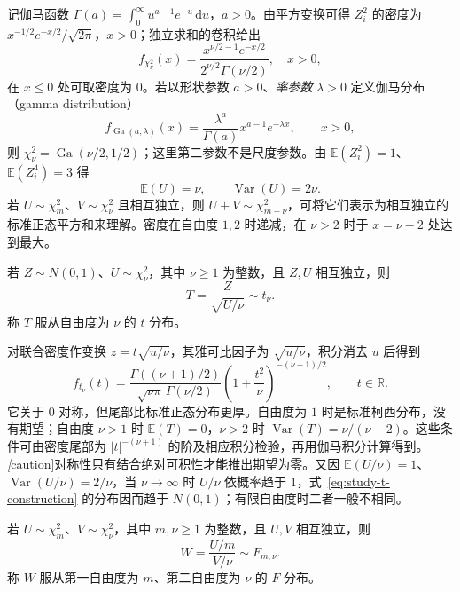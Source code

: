 记伽马函数 $\Gamma(a)=\int_0^\infty u^{a-1}e^{-u}\,\mathrm du$，$a>0$。由平方变换可得 $Z_i^2$ 的密度为 $x^{-1/2}e^{-x/2}/\sqrt{2\pi}$，$x>0$；独立求和的卷积给出
\begin{equation}
  f_{\chi^2_\nu}(x)
  =\frac{x^{\nu/2-1}e^{-x/2}}{2^{\nu/2}\Gamma(\nu/2)},
  \quad x>0,
  \label{eq:study-chi-square-density}
\end{equation}
在 $x\le0$ 处可取密度为 $0$。若以形状参数 $a>0$、\emph{率参数} $\lambda>0$ 定义伽马分布（gamma distribution）
\[
  f_{\operatorname{Ga}(a,\lambda)}(x)
  =\frac{\lambda^a}{\Gamma(a)}x^{a-1}e^{-\lambda x},\qquad x>0,
\]
则 $\chi^2_\nu=\operatorname{Ga}(\nu/2,1/2)$；这里第二参数不是尺度参数。由 $\mathbb E(Z_i^2)=1$、$\mathbb E(Z_i^4)=3$ 得
\[
  \mathbb E(U)=\nu,\qquad \operatorname{Var}(U)=2\nu.
\]
若 $U\sim\chi^2_m$、$V\sim\chi^2_\nu$ 且相互独立，则 $U+V\sim\chi^2_{m+\nu}$，可将它们表示为相互独立的标准正态平方和来理解。密度在自由度 $1,2$ 时递减，在 $\nu>2$ 时于 $x=\nu-2$ 处达到最大。

\begin{definition}[$t$ 分布]
\label{def:study-student-t}
若 $Z\sim N(0,1)$、$U\sim\chi^2_\nu$，其中 $\nu\ge1$ 为整数，且 $Z,U$ 相互独立，则
\begin{equation}
  T=\frac{Z}{\sqrt{U/\nu}}\sim t_\nu.
  \label{eq:study-t-construction}
\end{equation}
称 $T$ 服从自由度为 $\nu$ 的 $t$ 分布。
\end{definition}

对联合密度作变换 $z=t\sqrt{u/\nu}$，其雅可比因子为 $\sqrt{u/\nu}$，积分消去 $u$ 后得到
\begin{equation}
  f_{t_\nu}(t)
  =\frac{\Gamma((\nu+1)/2)}{\sqrt{\nu\pi}\,\Gamma(\nu/2)}
     \left(1+\frac{t^2}{\nu}\right)^{-(\nu+1)/2},
  \qquad t\in\mathbb R.
  \label{eq:study-t-density}
\end{equation}
它关于 $0$ 对称，但尾部比标准正态分布更厚。自由度为 $1$ 时是标准柯西分布，没有期望；自由度 $\nu>1$ 时 $\mathbb E(T)=0$，$\nu>2$ 时 $\operatorname{Var}(T)=\nu/(\nu-2)$。这些条件可由密度尾部为 $|t|^{-(\nu+1)}$ 的阶及相应积分检验，再用伽马积分计算得到。\emph[caution]{对称性只有结合绝对可积性才能推出期望为零。}又因 $\mathbb E(U/\nu)=1$、$\operatorname{Var}(U/\nu)=2/\nu$，当 $\nu\to\infty$ 时 $U/\nu$ 依概率趋于 $1$，式~\eqref{eq:study-t-construction} 的分布因而趋于 $N(0,1)$；有限自由度时二者一般不相同。

\begin{definition}[$F$ 分布]
\label{def:study-f-distribution}
若 $U\sim\chi^2_m$、$V\sim\chi^2_\nu$，其中 $m,\nu\ge1$ 为整数，且 $U,V$ 相互独立，则
\begin{equation}
  W=\frac{U/m}{V/\nu}\sim F_{m,\nu}.
  \label{eq:study-f-construction}
\end{equation}
称 $W$ 服从第一自由度为 $m$、第二自由度为 $\nu$ 的 $F$ 分布。
\end{definition}

